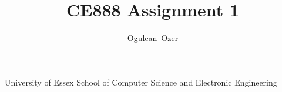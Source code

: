 \documentclass[journal]{IEEEtran}
\begin{document}
%
\title{CE888 Assignment 1}
%
%
%

\author{Ogulcan~Ozer}%


% 
%



%
{University of Essex School of Computer Science and Electronic Engineering}
% 
\end{document}
